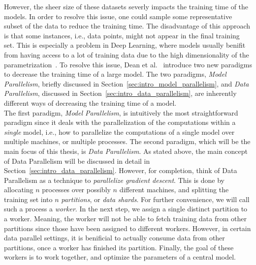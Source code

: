 However, the sheer size of these datasets severly impacts the training time of the models. In order to resolve this issue, one could sample some representative subset of the data to reduce the training time. The disadvantage of this approach is that some instances, i.e., data points, might not appear in the final training set. This is especially a problem in Deep Learning, where models usually benifit from having access to a lot of training data due to the high dimensionality of the parametrization~\cite{dean2012large}. To resolve this issue, Dean et al.~\cite{dean2012large} introduce two new paradigms to decrease the training time of a large model. The two paradigms, \emph{Model Parallelism}, briefly discussed in Section~\ref{sec:intro_model_parallelism}, and \emph{Data Parallelism}, discussed in Section~\ref{sec:intro_data_parallelism}, are inherently different ways of decreasing the training time of a model.\\

The first paradigm, \emph{Model Parallelism}, is intuitively the most straightforward paradigm since it deals with the parallelization of the computations within a \emph{single} model, i.e., how to parallelize the computations of a single model over multiple machines, or multiple processes. The second paradigm, which will be the main focus of this thesis, is \emph{Data Parallelism}. As stated above, the main concept of Data Parallelism will be discussed in detail in Section~\ref{sec:intro_data_parallelism}. However, for completion, think of Data Parallelism as a technique to \emph{parallelize gradient descent}. This is done by allocating $n$ processes over possibly $n$ different machines, and splitting the training set into $n$ \emph{partitions}, or \emph{data shards}. For further convenience, we will call such a process a \emph{worker}. In the next step, we assign a single distinct partition to a worker. Meaning, the worker will not be able to fetch training data from other partitions since those have been assigned to different workers. However, in certain data parallel settings, it is benificial to actually consume data from other partitions, once a worker has finished its partition. Finally, the goal of these workers is to work together, and optimize the parameters of a central model.\\

